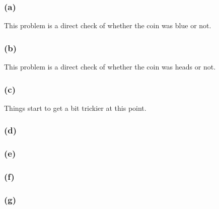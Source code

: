 \begin{appendices}

            \subsubsection*{(a)}
                This problem is a direct check of whether the coin was blue or not.

            \subsubsection*{(b)}
                This problem is a direct check of whether the coin was heads or not.

            \subsubsection*{(c)}
                Things start to get a bit trickier at this point.

            \subsubsection*{(d)}
            \subsubsection*{(e)}
            \subsubsection*{(f)}
            \subsubsection*{(g)}

\end{appendices}
